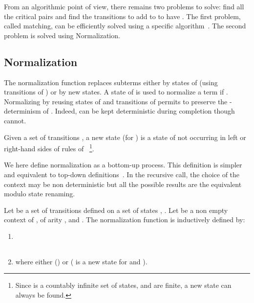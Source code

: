\documentclass[a4paper,11pt]{llncs}
\def \R {\mathcal{R}}
\newcommand{\desc}{\R^*}
\newcommand{\nr}{E}
\newcommand{\comp}{{\cal C}}
\theoremstyle{plain}
\begin{document}
\noindent
From an algorithmic point of view, there remains two problems to solve: find
all the critical pairs  and find the transitions
to add to  to have . The first
problem, called matching, can be efficiently solved using a specific
algorithm~\cite{FeuilladeGVTT-JAR04,Genet-Habil}. The second problem is solved
using Normalization.


\label{sec-tac}
\renewcommand{\oldcomp}{{\cal C}_{\R,\alpha}}
\renewcommand{\nr}{\alpha}
\renewcommand{\comp}{{\cal C}_{\R,\alpha}}
\renewcommand{\desc}[1]{#1^{*}}
\renewcommand{\desc}{\R^*}
\renewcommand{\nr}{E}
\renewcommand{\comp}{{\cal C}}


\subsection{Normalization}
\label{sec-norm}
The normalization function replaces subterms either by states of 
(using transitions of ) or by new states. A state  of  is used to
normalize a term  if . Normalizing by reusing states of
 and transitions of  permits to preserve the -determinism of
. Indeed,  can be kept deterministic during completion though
 cannot.

\begin{definition}
  Given a set of transitions , a new state (for ) is a state 
of  not occurring in left or right-hand sides of rules of
  ~\footnote{Since  is a countably infinite set of 
states,  and  are finite, a new state can always be found.}.
\end{definition}

\noindent
We here define normalization as a bottom-up process. This definition is simpler and
equivalent to top-down definitions~\cite{GenetR-JSC10}. In the recursive call,
the choice of the context  may be non deterministic but all the
possible results are the equivalent modulo state renaming. 

\begin{definition}[Normalization]
\label{def:normalization}
Let  be a set of transitions defined on a set of states , . Let  be a non empty context of
,  of arity 
, and . The normalization function is inductively
defined by:
\begin{enumerate}
\item 

\item  
\begin{tabular}[t]{l}
     \\
    
\end{tabular} 

where either () or ( is a new state for
 and
).
\end{enumerate} 
\end{definition}
\end{document}
